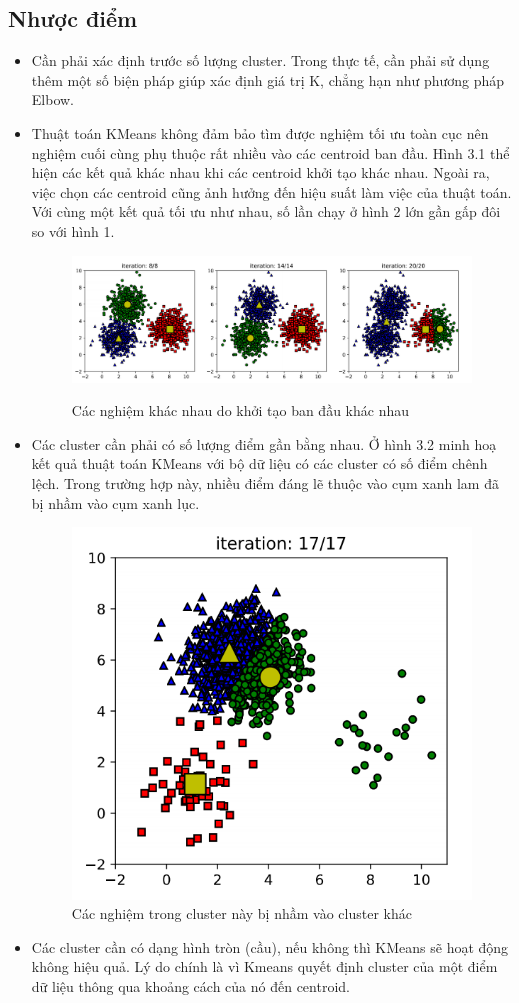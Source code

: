 \documentclass{article}
\begin{document}
\subsection{Nhược điểm}
\begin{itemize}
	\item Cần phải xác định trước số lượng cluster. Trong thực tế, cần phải sử dụng thêm một số biện pháp giúp xác định giá trị K, chẳng hạn như phương pháp Elbow.
	\item Thuật toán KMeans không đảm bảo tìm được nghiệm tối ưu toàn cục nên nghiệm cuối cùng phụ thuộc rất nhiều vào các centroid ban đầu. Hình 3.1 thể hiện các kết quả khác nhau khi các centroid khởi tạo khác nhau. Ngoài ra, việc chọn các centroid cũng ảnh hưởng đến hiệu suất làm việc của thuật toán. Với cùng một kết quả tối ưu như nhau, số lần chạy ở hình 2 lớn gần gấp đôi so với hình 1.\\
	\begin{figure}[h]
		\centering
		\includegraphics[width=0.7\linewidth]{img/disad_1}
		\label{dis1}
		\caption{Các nghiệm khác nhau do khởi tạo ban đầu khác nhau}
	\end{figure}
	\item Các cluster cần phải có số lượng điểm gần bằng nhau. Ở hình 3.2 minh hoạ kết quả thuật toán KMeans với bộ dữ liệu có các cluster có số điểm chênh lệch. Trong trường hợp này, nhiều điểm đáng lẽ thuộc vào cụm xanh lam đã bị nhầm vào cụm xanh lục.\par
	\begin{figure}[h]
		\centering
		\includegraphics[width=0.3\linewidth]{img/disad_2}
		\caption{Các nghiệm trong cluster này bị nhầm vào cluster khác}
	\end{figure}\par
	\item Các cluster cần có dạng hình tròn (cầu), nếu không thì KMeans sẽ hoạt động không hiệu quả. Lý do chính là vì Kmeans quyết định cluster của một điểm dữ liệu thông qua khoảng cách của nó đến centroid.	

\end{itemize}
\end{document}
